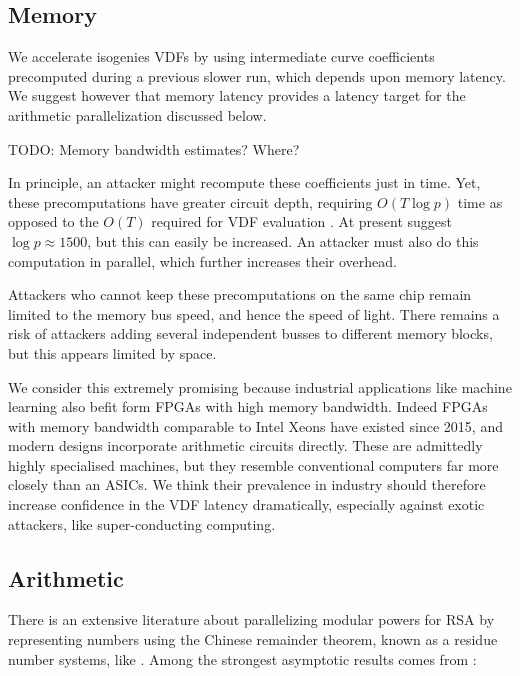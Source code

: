 \documentclass{article}
\begin{document}
\subsection{Memory}

We accelerate isogenies VDFs by using intermediate curve coefficients
precomputed during a previous slower run, which depends upon memory
latency.  We suggest however that memory latency provides a latency
target for the arithmetic parallelization discussed below.

TODO:  Memory bandwidth estimates?  Where?

In principle, an attacker might recompute these coefficients just in
time.  Yet, these precomputations have greater circuit depth, requiring
$O(T \log p)$ time as opposed to the $O(T)$ required for VDF evaluation
\cite[pp. 21]{cryptoeprint:2019:166}.  At present \cite[pp. 15]{cryptoeprint:2019:166} 
suggest $\log p \approx 1500$, but this can easily be increased.
An attacker must also do this computation in parallel, which further
increases their overhead.

Attackers who cannot keep these precomputations on the same chip remain
limited to the memory bus speed, and hence the speed of light. 
There remains a risk of attackers adding several independent busses to
different memory blocks, but this appears limited by space.

We consider this extremely promising because industrial applications
like machine learning also befit form FPGAs with high memory bandwidth.
Indeed FPGAs with memory bandwidth comparable to Intel Xeons have
existed since 2015, and 
modern designs incorporate arithmetic circuits directly.
These are admittedly highly specialised machines, but they resemble
conventional computers far more closely than an ASICs.
We think their prevalence in industry should therefore increase
confidence in the VDF latency dramatically, especially against
exotic attackers, like super-conducting computing.

\subsection{Arithmetic}

There is an extensive literature about parallelizing modular powers
for RSA by representing numbers using the Chinese remainder theorem,
known as a residue number systems, like \cite{RNSonGPU07,Moss07,Araujo12}.
Among the strongest asymptotic results comes from \cite{BernsteinSorenson07}:
\end{document}
